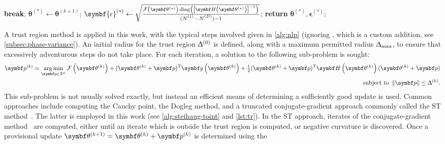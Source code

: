 \begin{algorithm}
\begin{algorithmic}[1]
                \EndIf\label{state:neg-amp-end}
                    \State \textbf{break};
                \EndIf
            \EndFor
            \State $\symbf{\theta}^{(*)} \gets \symbf{\theta}^{(k+1)}$;
            \State $\symbf{\epsilon}^{(*)} \gets
                \sqrt{
                    \frac
                    {
                        \Fthstar \diag \left(
                            \left[\bdHthstar\right]^{-1}
                        \right)
                    }
                    {(\None \cdots \ND) - 1}
                }$;
            \State \textbf{return} $\symbf{\theta}^{(*)}, \symbf{\epsilon}^{(*)}$;
        \EndProcedure
    \end{algorithmic}
\end{algorithm}
A trust region method is applied in this work,
with the typical steps involved given in
\cref{alg:nlp} (ignoring , which is a custom addition,
see \cref{subsec:phase-variance}). An initial radius for the trust region
$\Updelta^{(0)}$ is defined, along with a maximum permitted radius
$\Updelta_{\text{max}}$, to ensure that excessively adventurous steps do not take place.
For each iteration, a solution to the following sub-problem is sought:
\begin{equation}
    \begin{split}
        \bpk = \argmin_{\bp \in \mathbb{R}^{n}}
            \Fthk +
            (\bthk + \bp)\T \bdgthk +
            \tfrac{1}{2} (\bthk + \bp)\T \bdHthk (\bthk + \bp) \\
        \text{subject to } \left \lVert \bp \right \rVert \leq \trustradius{k}.
    \end{split}
\end{equation}
This sub-problem is not usually solved exactly, but instead an efficient
means of determining a sufficiently good update is used.
Common approaches include computing the Cauchy point, the Dogleg
method, and a truncated conjugate-gradient
approach commonly called the \ac{ST} method~\cite[Chapter 7]{Nocedal2006}.
The latter is employed in this work (see \cref{alg:steihaug-toint} and
\cref{lst:tr}). In the \ac{ST} approach, iterates of the conjugate-gradient
method~\cite[Chapter 5]{Nocedal2006} are computed, either until an iterate which
is outside the trust region is computed, or negative curvature is discovered.
Once a provisional update $\bthkplusone = \bthk + \bpk$ is determined using the
